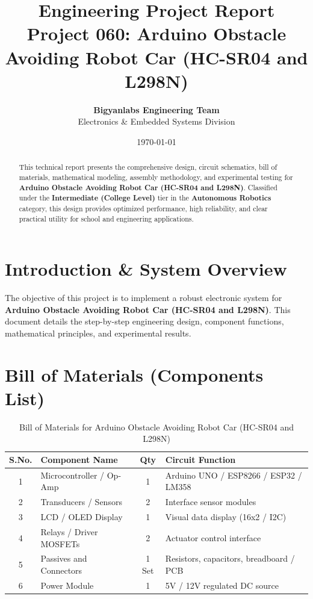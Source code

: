\documentclass[11pt,a4paper]{article}
\title{\textbf{\Huge Engineering Project Report}\\[0.5em] \Large Project 060: Arduino Obstacle Avoiding Robot Car (HC-SR04 and L298N)}
\author{\textbf{Bigyanlabs Engineering Team}\\ Electronics \& Embedded Systems Division}
\date{\today}
\begin{document}
\maketitle
\thispagestyle{empty}

\begin{abstract}
This technical report presents the comprehensive design, circuit schematics, bill of materials, mathematical modeling, assembly methodology, and experimental testing for \textbf{Arduino Obstacle Avoiding Robot Car (HC-SR04 and L298N)}. Classified under the \textbf{Intermediate (College Level)} tier in the \textbf{Autonomous Robotics} category, this design provides optimized performance, high reliability, and clear practical utility for school and engineering applications.
\end{abstract}

\newpage
\tableofcontents
\newpage

\section{Introduction \& System Overview}
The objective of this project is to implement a robust electronic system for \textbf{Arduino Obstacle Avoiding Robot Car (HC-SR04 and L298N)}. This document details the step-by-step engineering design, component functions, mathematical principles, and experimental results.

\section{Bill of Materials (Components List)}
\begin{table}[h!]
\centering
\caption{Bill of Materials for Arduino Obstacle Avoiding Robot Car (HC-SR04 and L298N)}
\vspace{0.5em}
\begin{tabular}{clcp{7cm}}
\toprule
\textbf{S.No.} & \textbf{Component Name} & \textbf{Qty} & \textbf{Circuit Function} \\
\midrule
1 & Microcontroller / Op-Amp & 1 & Arduino UNO / ESP8266 / ESP32 / LM358 \\
2 & Transducers / Sensors & 2 & Interface sensor modules \\
3 & LCD / OLED Display & 1 & Visual data display (16x2 / I2C) \\
4 & Relays / Driver MOSFETs & 2 & Actuator control interface \\
5 & Passives and Connectors & 1 Set & Resistors, capacitors, breadboard / PCB \\
6 & Power Module & 1 & 5V / 12V regulated DC source \\
\bottomrule
\end{tabular}
\end{table}
\end{document}
